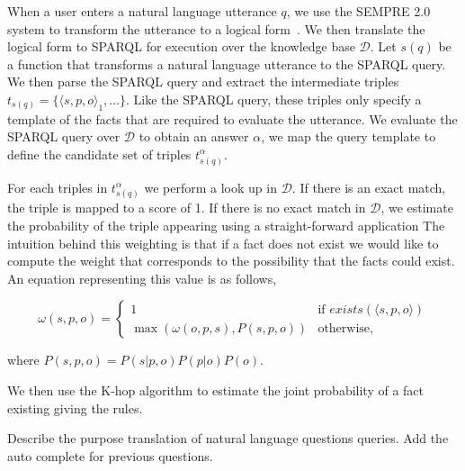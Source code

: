 When a user enters a natural language utterance \(q\), we use the SEMPRE 2.0 system to transform the utterance to a logical form~\cite{berant2013freebase,berant2013semantic}.
We then translate the logical form to SPARQL for execution over the knowledge base \(\mathcal{D}\).
Let \(s(q)\) be a function that transforms a natural language utterance to the SPARQL query.
We then parse the SPARQL query and extract the intermediate triples \( t_{s(q)} = \{\langle s,p,o\rangle_1, \ldots \}\). 
Like the SPARQL query, these triples only specify a template of the facts that are required to evaluate the utterance.
We evaluate the SPARQL query over \(\mathcal{D}\) to obtain an answer \( \alpha \), we map the query template to define the candidate set of triples \( t^\alpha_{s(q)} \).

For each triples in \( t^\alpha_{s(q)} \) we perform a look up in \(\mathcal{D}\).
If there is an exact match, the triple is mapped to a score of 1.
If there is no exact match in \(\mathcal{D}\), we estimate the probability of the triple appearing using a straight-forward application
The intuition behind this weighting is that if a fact does not exist we would like to compute the weight that corresponds to the possibility that the facts could exist.
An equation representing this value is as follows,

\begin{equation}
  \label{eq:probqa-weight}
  \omega(s,p,o) = \begin{cases}
    1 & \mbox{if } exists(\langle s,p,o \rangle) \\ 
    \max( \omega(o,p,s), P(s,p,o)) & \mbox{otherwise,}
  \end{cases}
\end{equation}

where \( P(s,p,o) = P(s|p,o)  P(p|o)  P(o) \).

We then use the K-hop algorithm to estimate the joint probability of a fact existing giving the rules.



Describe the purpose translation of natural language questions queries.
Add the auto complete for previous questions.


